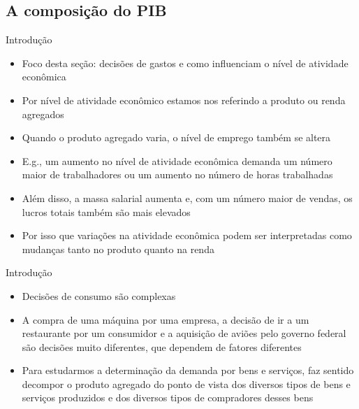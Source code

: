 \documentclass[10pt]{beamer}
\begin{document}
\subsection{A composição do PIB}
\begin{frame}{Introdução}
    \begin{itemize}
        \item Foco desta seção: decisões de gastos e como influenciam o nível de atividade econômica\bigskip
         
        \item Por nível de atividade econômico estamos nos referindo a produto ou renda agregados\bigskip
         
        \item Quando o produto agregado varia, o nível de emprego também se altera\bigskip
         
        \item E.g., um aumento no nível de atividade econômica demanda um número maior de trabalhadores ou um aumento no número de horas trabalhadas\bigskip
         
        \item Além disso, a massa salarial aumenta e, com um número maior de vendas, os lucros totais também são mais elevados\bigskip
         
        \item Por isso que variações na atividade econômica podem ser interpretadas como mudanças tanto no produto quanto na renda
    \end{itemize}
\end{frame}

\begin{frame}{Introdução}
    \begin{itemize}
        \item Decisões de consumo são complexas\bigskip
         
        \item A compra de uma máquina por uma empresa, a decisão de ir a um restaurante por um consumidor e a aquisição de aviões pelo governo federal são decisões muito diferentes, que dependem de fatores diferentes\bigskip
         
        \item Para estudarmos a determinação da demanda por bens e serviços, faz sentido decompor o produto agregado do ponto de vista dos diversos tipos de bens e serviços produzidos e dos diversos tipos de compradores desses bens
    \end{itemize}
\end{frame}
\end{document}
